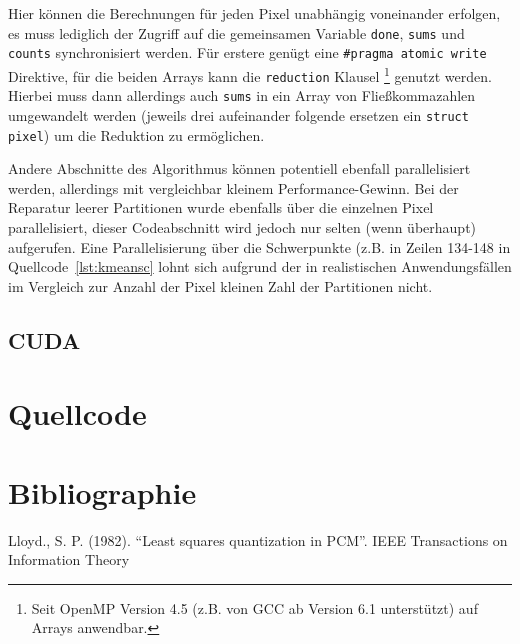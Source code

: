 \documentclass[ngerman, cd=lightcolor, cdmath=false]{tudscrreprt}
\begin{document}


Hier können die Berechnungen für jeden Pixel unabhängig voneinander erfolgen,
es muss lediglich der Zugriff auf die gemeinsamen Variable \texttt{done},
\texttt{sums} und \texttt{counts} synchronisiert werden. Für erstere genügt
eine \texttt{\#pragma atomic write} Direktive, für die beiden Arrays kann die
\texttt{reduction} Klausel \footnote{Seit OpenMP Version 4.5 (z.B. von GCC ab
Version 6.1 unterstützt) auf Arrays anwendbar.} genutzt werden. Hierbei muss
dann allerdings auch \texttt{sums} in ein Array von Fließkommazahlen
umgewandelt werden (jeweils drei aufeinander folgende ersetzen ein
\texttt{struct pixel}) um die Reduktion zu ermöglichen.

Andere Abschnitte des Algorithmus können potentiell ebenfall parallelisiert
werden, allerdings mit vergleichbar kleinem Performance-Gewinn. Bei der
Reparatur leerer Partitionen wurde ebenfalls über die einzelnen Pixel
parallelisiert, dieser Codeabschnitt wird jedoch nur selten (wenn überhaupt)
aufgerufen. Eine Parallelisierung über die Schwerpunkte (z.B. in Zeilen 134-148
in Quellcode~\ref{lst:kmeansc} lohnt sich aufgrund der in realistischen
Anwendungsfällen im Vergleich zur Anzahl der Pixel kleinen Zahl der Partitionen
nicht.

\section{CUDA}

\chapter{Quellcode}

\chapter{Bibliographie}
\begin{thebibliography}{1}
Lloyd., S. P. (1982). ``Least squares quantization in PCM''. IEEE Transactions
on Information Theory
\end{thebibliography}
\end{document}
